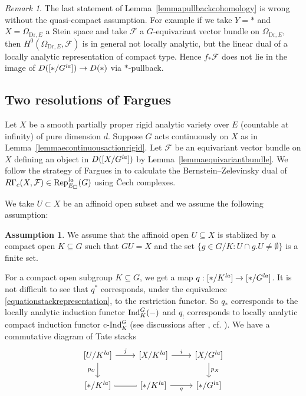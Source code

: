 \documentclass[a4paper,10pt]{amsart}
\theoremstyle{remark}
\newtheorem{remark}[theorem]{Remark}
\theoremstyle{definition}
\newtheorem{assumption}[theorem]{Assumption}
\theoremstyle{plain}
\numberwithin{equation}{section}
\newcommand{\calF}{{\mathcal F}}
\newcommand{\Ind}{{\rm Ind}}
\newcommand{\la}{{\it la}}
\newcommand{\Rep}{{\rm Rep}}
\newcommand{\cInd}{\mathrm{c\text{-}Ind}}
\begin{document}
\begin{remark}
	The last statement of Lemma~\ref{lemmapullbackcohomology} is wrong without the quasi-compact assumption. For example if we take $Y=*$ and $X=\Omega_{\mathrm{Dr},E}$ a Stein space and take $\calF$ a $G$-equivariant vector bundle on $\Omega_{\mathrm{Dr},E}$, then $H^0(\Omega_{\mathrm{Dr},E},\calF)$ is in general not locally analytic, but the linear dual of a locally analytic representation of compact type. Hence $f_*\calF$ does not lie in the image of $D([*/G^{\la}])\rightarrow D(*)$ via $*$-pullback.
\end{remark}
\subsection{Two resolutions of Fargues}\label{subsectionresolutionFargues}\label{subsectionconclude}
Let $X$ be a smooth partially proper rigid analytic variety over $E$ (countable at infinity) of pure dimension $d$. Suppose $G$ acts continuously on $X$ as in Lemma~\ref{lemmaecontinuousactionrigid}. Let $\calF$ be an equivariant vector bundle on $X$ defining an object in $D([X/G^{\la}])$ by Lemma~\ref{lemmaequivariantbundle}. We follow the strategy of Fargues in \cite{Farguesdualite} to calculate the Bernstein--Zelevinsky dual of $R\Gamma_c(X,\calF)\in \Rep^{\la}_{E_\square}(G)$ using \v{C}ech complexes.

We take $U\subset X$ be an affinoid open subset and we assume the following assumption:
\begin{assumption}\label{assumptionaffionid}
	We assume that the affinoid open $U\subseteq X$ is stablized by a compact open $K\subseteq G$ such that $GU=X$ and the set $\{g\in G/K: U\cap g.U\neq \emptyset\}$ is a finite set. 
\end{assumption}

For a compact open subgroup $K\subseteq G$, we get a map $q:[*/K^{\la}]\to [*/G^{\la}]$. It is not difficult to see that $q^*$ corresponds, under the equivalence \eqref{equationstackrepresentation}, to the restriction functor. So $q_*$ corresponds to the locally analytic induction functor $\Ind_K^G(-)$ and $q_!$ corresponds to locally analytic compact induction functor $\cInd_K^G$ (see discussions after \cite[Corollary 3.3.7]{JC23}, cf. \cite[\S~1.4]{heyer20246functor}). We have a commutative diagram of Tate stacks
\begin{equation}\label{equationdiamgramUKXG}
\begin{tikzcd}
{[U/K^{\la}]}
\arrow[r,"j"]
\arrow[d,"p_U"']
& {[X/K^{\la}]}
\arrow[r,"i"]
& {[X/G^{\la}]}
\arrow[d,"p_X"]\\
{[*/K^{\la}]}
\arrow[r,equals]
& {[*/K^{\la}]}
\arrow[r,"q"']
& {[*/G^{\la}]}
\end{tikzcd}
\end{equation}
\end{document}
